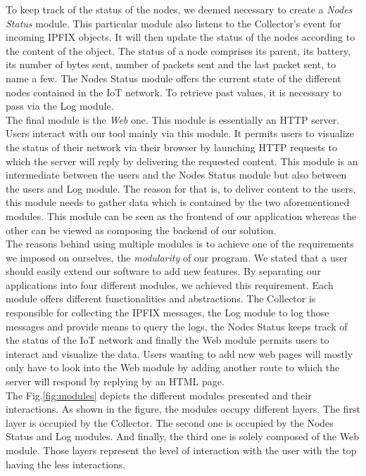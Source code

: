 To keep track of the status of the nodes, we deemed necessary to create a \textit{Nodes Status} module. This particular module also listens to the Collector's event for incoming IPFIX objects. It will then update the status of the nodes according to the content of the object. The status of a node comprises its parent, its battery, its number of bytes sent, number of packets sent and the last packet sent, to name a few. The Nodes Status module offers the current state of the different nodes contained in the IoT network. To retrieve past values, it is necessary to pass via the Log module. \\

The final module is the \textit{Web} one. This module is essentially an HTTP server. Users interact with our tool mainly via this module. It permits users to visualize the status of their network via their browser by launching HTTP requests to which the server will reply by delivering the requested content. This module is an intermediate between the users and the Nodes Status module but also between the users and Log module. The reason for that is, to deliver content to the users, this module needs to gather data which is contained by the two aforementioned modules. This module can be seen as the frontend of our application whereas the other can be viewed as composing the backend of our solution.\\

The reasons behind using multiple modules is to achieve one of the requirements we imposed on ourselves, the \textit{modularity} of our program. We stated that a user should easily extend our software to add new features. By separating our applications into four different modules, we achieved this requirement. Each module offers different functionalities and abstractions. The Collector is responsible for collecting the IPFIX messages, the Log module to log those messages and provide means to query the logs, the Nodes Status keeps track of the status of the IoT network and finally the Web module permits users to interact and visualize the data. Users wanting to add new web pages will mostly only have to look into the Web module by adding another route to which the server will respond by replying by an HTML page. \\

The Fig.\ref{fig:modules} depicts the different modules presented and their interactions. As shown in the figure, the modules occupy different layers. The first layer is occupied by the Collector. The second one is occupied by the Nodes Status and Log modules. And finally, the third one is solely composed of the Web module. Those layers represent the level of interaction with the user with the top having the less interactions.

